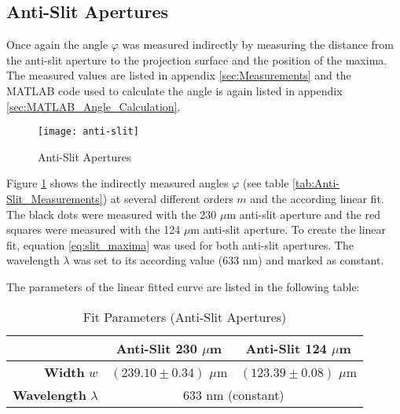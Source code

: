 \subsection{Anti-Slit Apertures}
\label{subsec:Anti-Slit}
Once again the angle $\varphi$ was measured indirectly by measuring the distance from the anti-slit aperture to the projection surface and the position of the maxima. The measured values are listed in appendix \ref{sec:Measurements} and the MATLAB code used to calculate the angle is again listed in appendix \ref{sec:MATLAB_Angle_Calculation}.
\begin{figure}[H]
	\centering
	\texttt{[image: anti-slit]}
	\caption{Anti-Slit Apertures}
	\label{fig:Anti-Slit}
\end{figure}
Figure \ref{fig:Anti-Slit} shows the indirectly measured angles $\varphi$ (see table \ref{tab:Anti-Slit_Measurements}) at several different orders $m$ and the according linear fit. The black dots were measured with the 230 $\mu$m anti-slit aperture and the red squares were measured with the 124 $\mu$m anti-slit aperture. To create the linear fit, equation \ref{eq:slit_maxima} was used for both anti-slit apertures. The wavelength $\lambda$ was set to its according value (633 nm) and marked as constant.

The parameters of the linear fitted curve are listed in the following table:
\begin{table}[H]
	\centering
	\renewcommand{\arraystretch}{1.3}
	\begin{tabular}{r|c c}
		& \textbf{Anti-Slit 230 $\mu$m} & \textbf{Anti-Slit 124 $\mu$m} \\
		\hline\hline
		\textbf{Width} $w$ & $(239.10\pm0.34)$ $\mu$m & $(123.39\pm0.08)$ $\mu$m \\		
		\textbf{Wavelength} $\lambda$ & \multicolumn{2}{c}{633 nm (constant)}
	\end{tabular}
	\caption{Fit Parameters (Anti-Slit Apertures)}
	\label{tab:Anti-Slit}
\end{table}
\newpage
